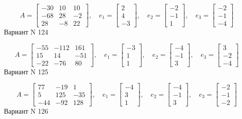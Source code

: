 \documentclass[11pt]{report}
\begin{document}
$$A = \left[\begin{matrix}-30 & 10 & 10\\-68 & 28 & -2\\28 & -8 & 22\end{matrix}\right],\quad e_1 = \left[\begin{matrix}2\\4\\-3\end{matrix}\right],\quad e_2 = \left[\begin{matrix}-2\\-1\\1\end{matrix}\right],\quad e_3 = \left[\begin{matrix}-2\\-1\\-4\end{matrix}\right]$$Вариант N 124

$$A = \left[\begin{matrix}-55 & -112 & 161\\15 & 14 & -51\\-22 & -76 & 80\end{matrix}\right],\quad e_1 = \left[\begin{matrix}-3\\1\\1\end{matrix}\right],\quad e_2 = \left[\begin{matrix}-4\\-1\\3\end{matrix}\right],\quad e_3 = \left[\begin{matrix}3\\-2\\-4\end{matrix}\right]$$Вариант N 125

$$A = \left[\begin{matrix}77 & -19 & 1\\5 & 125 & -35\\-44 & -92 & 128\end{matrix}\right],\quad e_1 = \left[\begin{matrix}-4\\3\\1\end{matrix}\right],\quad e_2 = \left[\begin{matrix}-4\\-1\\3\end{matrix}\right],\quad e_3 = \left[\begin{matrix}-2\\-1\\-2\end{matrix}\right]$$Вариант N 126
\end{document}
